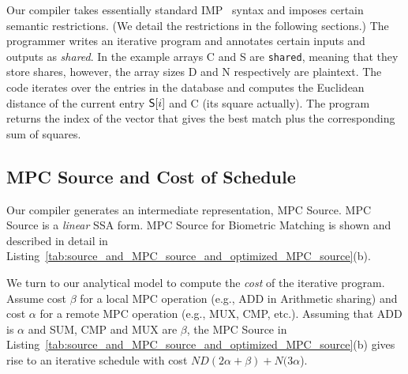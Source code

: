 Our compiler takes essentially standard IMP~\cite{Nipkow2014}
syntax and imposes certain semantic restrictions. (We detail the restrictions in the following sections.)
The programmer writes an iterative program and annotates certain inputs
and outputs as \emph{shared}. In the example arrays {\sf C} and {\sf S}
are \texttt{shared}, meaning that they store shares, however, the array sizes {\sf D} and
{\sf N} respectively are plaintext. The code iterates over the entries in the
database and computes the Euclidean distance of the current
entry ${\sf S}[i]$ and {\sf C} (its square actually). The program returns the index of the vector that gives
the best match plus the corresponding sum of squares.

\subsection{MPC Source and Cost of Schedule}

Our compiler generates an intermediate representation, MPC Source. 
MPC Source is a \emph{linear} SSA form.
MPC Source for Biometric Matching is shown and described in detail in
Listing~\ref{tab:source_and_MPC_source_and_optimized_MPC_source}(b). 


\begin{comment}
First, MPC Source is an SSA form.
Second, it is linear. The conditional in lines 13-14 in IMP Source turns into the linear code in lines 12-16 in MPC Source.
The test turns into the CMP operation {\sf t = CMP(sum!3,min\_sum!2)}, followed by the
true-branch sequence, followed by the MUX operations. The first MUX operation selects the value
of {\sf min\_sum}: if {\sf t} is true, then {\sf min\_sum} gets the value of the second multiplexer
argument,  {\sf min\_sum!3}, otherwise it takes the value of the third argument, {\sf min\_sum!2}.
Third, MPC Source is a special form of SSA. The SSA $\phi$-nodes at the if-then-else (lines 13-15) turn into
MUX operations, while the $\phi$-nodes at for-loops turn into \emph{pseudo} PHI nodes with a straightforward semantics.
\end{comment}

We turn to our analytical model to compute the \emph{cost} of the iterative program. Assume
cost $\beta$ for a local MPC operation (e.g., ADD in Arithmetic sharing) and cost $\alpha$ for a remote
MPC operation (e.g., MUX, CMP, etc.). Assuming that ADD is $\alpha$ and SUM, CMP and MUX are $\beta$, 
the MPC Source in Listing~\ref{tab:source_and_MPC_source_and_optimized_MPC_source}(b) gives 
rise to an iterative schedule with cost $ND(2\alpha+\beta) + N(3\alpha$).

